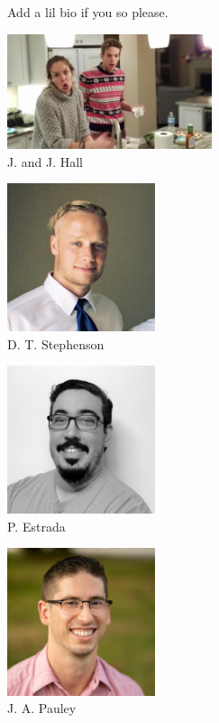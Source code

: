 \vspace{-0.9in}
Add a lil bio if you so please. 
\vspace{0.25in}
\begin{multicols}{2}
    \begin{center}
    \includegraphics[width=0.45\textwidth]{Pictures/j&j_mawf_about_authors.jpeg}\\
    J. and J. Hall
\end{center}
\vspace{-0.15in}
\begin{center}
    \includegraphics[width=0.325\textwidth]{Pictures/Dan_bio_pic.jpeg}\\
    D. T. Stephenson
\end{center}
\vspace{-0.15in}
\begin{center}
    \includegraphics[width=0.325\textwidth]{Pictures/pedro_bio.png}\\
    P. Estrada
\end{center}
\vspace{-0.15in}
\begin{center}
    \includegraphics[width=0.325\textwidth]{Pictures/jake_bio_pic.jpeg}\\
    J. A. Pauley
\end{center}
\end{multicols}
